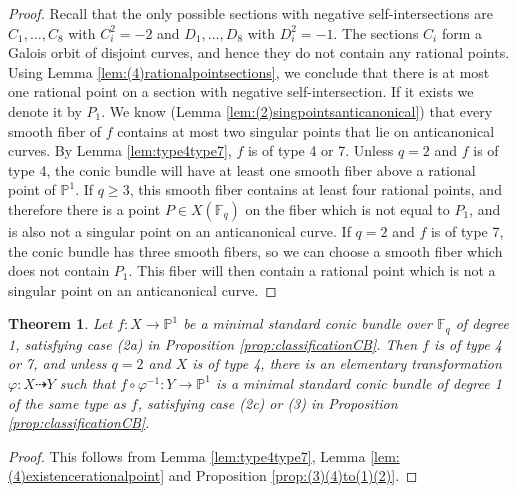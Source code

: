 \documentclass[a4paper, 11pt, reqno]{amsart}
\numberwithin{equation}{section} \numberwithin{figure}{section}
\def \F {{\mathbb F}}
\def \P {{\mathbb P}}
\newcommand{\ra}{\rightarrow}
\newtheorem{theorem}[lemma]{Theorem}
\theoremstyle{definition}
\numberwithin{lemma}{section}
\begin{document}
\begin{proof}
    Recall that the only possible sections with negative self-intersections are $C_1, \ldots, C_8$ with $C_i^2 = -2$ and $D_1, \ldots, D_8$ with $D_i^2 = -1$. The sections $C_i$ form a Galois orbit of disjoint curves, and hence they do not contain any rational points. Using Lemma \ref{lem:(4)rationalpointsections}, we conclude that there is at most one rational point on a section with negative self-intersection. If it exists we denote it by $P_1$. We know (Lemma \ref{lem:(2)singpointsanticanonical}) that every smooth fiber of $f$ contains at most two singular points that lie on anticanonical curves. By Lemma \ref{lem:type4type7}, $f$ is of type 4 or 7. Unless $q = 2$ and $f$ is of type 4, the conic bundle will have at least one smooth fiber above a rational point of $\P^1$. If $q \geq 3$, this smooth fiber contains at least four rational points, and therefore there is a point $P \in X(\F_q)$ on the fiber which is not equal to $P_1$, and is also not a singular point on an anticanonical curve. If $q = 2$ and $f$ is of type 7, the conic bundle has three smooth fibers, so we can choose a smooth fiber which does not contain $P_1$. This fiber will then contain a rational point which is not a singular point on an anticanonical curve.
\end{proof}

\begin{theorem}\label{thm:(2a)to(2c,3)}
    Let $f \colon X \ra \P^1$ be a minimal standard conic bundle over $\F_q$ of degree 1, satisfying case (2a) in Proposition \ref{prop:classificationCB}. Then $f$ is of type 4 or 7, and unless $q = 2$ and $X$ is of type 4, there is an elementary transformation $\varphi \colon X \dashrightarrow Y$ such that $f \circ \varphi^{-1} \colon Y \ra \P^1$ is a minimal standard conic bundle of degree 1 of the same type as $f$, satisfying case (2c) or (3) in Proposition \ref{prop:classificationCB}.
\end{theorem}

\begin{proof}
    This follows from Lemma \ref{lem:type4type7}, Lemma \ref{lem:(4)existencerationalpoint} and Proposition \ref{prop:(3)(4)to(1)(2)}.
\end{proof}
\end{document}
